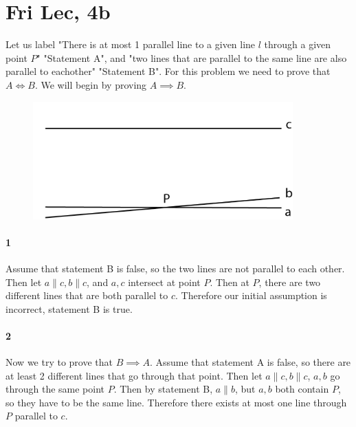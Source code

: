 \documentclass[12pt]{article}
\begin{document}
\section{Fri Lec, 4b}
Let us label "There is at most 1 parallel line to a given line $l$ through a given point $P$" "Statement A", and "two lines that are parallel to  the same line are also parallel to eachother" "Statement B".
\newline
For this problem we need to prove that $A \iff B$. We will begin by proving $A \implies B$.
\newline
\begin{figure}[h]
    \includegraphics[width = 100mm]{GRAPH5.png}
\end{figure}
\paragraph{1}
Assume that statement B is false, so the two lines are not parallel to each other. Then let $a \parallel c, b \parallel c$, and $a, c$ intersect at point $P$. Then at $P$, there are two different lines that are both parallel to $c$. \lightning
\newline
Therefore our initial assumption is incorrect, statement B is true.
\paragraph{2}
Now we try to prove that $B \implies A$. Assume that statement A is false, so there are at least 2 different lines that go through that point. Then let $a \parallel c, b \parallel c$, $a,b$ go through the same point $P$.
Then by statement B, $a \parallel b$, but $a, b$ both contain $P$, so they have to be the same line. \lightning
\newline
Therefore there exists at most one line through $P$ parallel to $c$.
\end{document}
